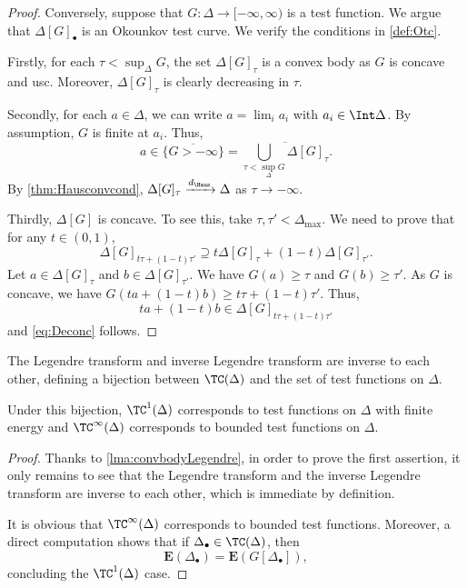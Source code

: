 \begin{proof}
    Conversely, suppose that $G\colon \Delta\rightarrow [-\infty,\infty)$ is a test function. We argue that $\Delta[G]_{\bullet}$ is an Okounkov test curve. We verify the conditions in \cref{def:Otc}.

    Firstly, for each $\tau< \sup_{\Delta}G$, the set $\Delta[G]_{\tau}$ is a convex body as $G$ is concave and usc.
	Moreover, $\Delta[G]_{\tau}$ is clearly decreasing in $\tau$.

	Secondly, for each $a\in \Delta$, we can write $a=\lim_{i}a_i$ with $a_i\in \Int \Delta$. By assumption, $G$ is finite at $a_i$. Thus,
	\[
		a\in \overline{\{G>-\infty\}}=\overline{\bigcup_{\tau<\sup_{\Delta}G}\Delta[G]_{\tau}}.
	\]
	By \cref{thm:Hausconvcond}, $\Delta[G]_{\tau}\xrightarrow{d_{\Haus}}\Delta$ as $\tau\to -\infty$.

	Thirdly, $\Delta[G]$ is concave. To see this, take $\tau,\tau'< \Delta_{\max}$. We need to prove that for any $t\in (0,1)$,
	\begin{equation}\label{eq:Deconc}
		\Delta[G]_{t\tau+(1-t)\tau'}\supseteq t\Delta[G]_{\tau}+(1-t)\Delta[G]_{\tau'}.
	\end{equation}
	Let $a\in \Delta[G]_{\tau}$ and $b\in \Delta[G]_{\tau'}$. We have $G(a)\geq\tau$ and $G(b)\geq \tau'$. As $G$ is concave, we have $G(ta+(1-t)b)\geq t\tau+(1-t)\tau'$. Thus,
	\[
		ta+(1-t)b\in \Delta[G]_{t\tau+(1-t)\tau'}
	\]
	and \eqref{eq:Deconc} follows.
\end{proof}

\begin{theorem}\label{thm:Okotestcurve}
	The Legendre transform and inverse Legendre transform are inverse to each other,
	defining a bijection between $\TC(\Delta)$ and the set of test functions on $\Delta$.

    Under this bijection, $\TC^1(\Delta)$ corresponds to test functions on $\Delta$ with finite energy and $\TC^{\infty}(\Delta)$ corresponds to bounded test functions on $\Delta$.
\end{theorem}
\begin{proof}
    Thanks to \cref{lma:convbodyLegendre}, in order to prove the first assertion, it only remains to see that the Legendre transform and the inverse Legendre transform are inverse to each other, which is immediate by definition.

    It is obvious that $\TC^{\infty}(\Delta)$ corresponds to bounded test functions. Moreover, a direct computation shows that if $\Delta_{\bullet}\in \TC(\Delta)$, then
    \[
    \mathbf{E}(\Delta_{\bullet})=\mathbf{E}(G[\Delta_{\bullet}]),
    \]
    concluding the $\TC^{1}(\Delta)$ case.
\end{proof}

